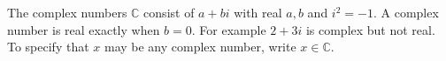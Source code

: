 The complex numbers $\mathbb C$ consist of $a+bi$ with real $a,b$ and $i^2=-1$. A complex number is real exactly when $b=0$. For example $2+3i$ is complex but not real. To specify that $x$ may be any complex number, write $x\in\mathbb C$.
